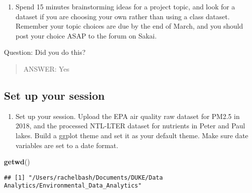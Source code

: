 \documentclass[]{article}
\newenvironment{Shaded}{\begin{snugshade}}{\end{snugshade}}
\newcommand{\KeywordTok}[1]{\textcolor[rgb]{0.13,0.29,0.53}{\textbf{#1}}}
\newcommand{\NormalTok}[1]{#1}
\providecommand{\tightlist}{%
  \setlength{\itemsep}{0pt}\setlength{\parskip}{0pt}}
\begin{document}
\begin{enumerate}
\def\labelenumi{\arabic{enumi}.}
\tightlist
\item
  Spend 15 minutes brainstorming ideas for a project topic, and look for
  a dataset if you are choosing your own rather than using a class
  dataset. Remember your topic choices are due by the end of March, and
  you should post your choice ASAP to the forum on Sakai.
\end{enumerate}

Question: Did you do this?

\begin{quote}
ANSWER: Yes
\end{quote}

\subsection{Set up your session}\label{set-up-your-session}

\begin{enumerate}
\def\labelenumi{\arabic{enumi}.}
\setcounter{enumi}{1}
\tightlist
\item
  Set up your session. Upload the EPA air quality raw dataset for PM2.5
  in 2018, and the processed NTL-LTER dataset for nutrients in Peter and
  Paul lakes. Build a ggplot theme and set it as your default theme.
  Make sure date variables are set to a date format.
\end{enumerate}

\begin{Shaded}
\begin{Highlighting}[]
\KeywordTok{getwd}\NormalTok{()}
\end{Highlighting}
\end{Shaded}

\begin{verbatim}
## [1] "/Users/rachelbash/Documents/DUKE/Data Analytics/Environmental_Data_Analytics"
\end{verbatim}
\end{document}
